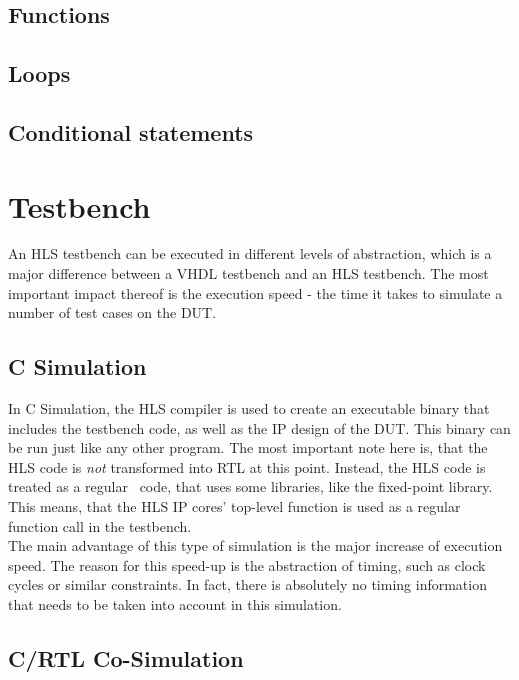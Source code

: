 \subsection{Functions}

\subsection{Loops}

\subsection{Conditional statements}

\section{Testbench}

An HLS testbench can be executed in different levels of abstraction, which is a major difference between a VHDL testbench and an HLS testbench.
The most important impact thereof is the execution speed - the time it takes to simulate a number of test cases on the DUT.

\subsection{C Simulation}

In C Simulation, the HLS compiler is used to create an executable binary that includes the testbench code, as well as the IP design of the DUT.
This binary can be run just like any other program.
The most important note here is, that the HLS code is \textit{not} transformed into RTL at this point.
Instead, the HLS code is treated as a regular \cplusplus\ code, that uses some libraries, like the fixed-point library.
This means, that the HLS IP cores' top-level function is used as a regular function call in the testbench.\\

The main advantage of this type of simulation is the major increase of execution speed.
The reason for this speed-up is the abstraction of timing, such as clock cycles or similar constraints.
In fact, there is absolutely no timing information that needs to be taken into account in this simulation.

\subsection{C/RTL Co-Simulation}

